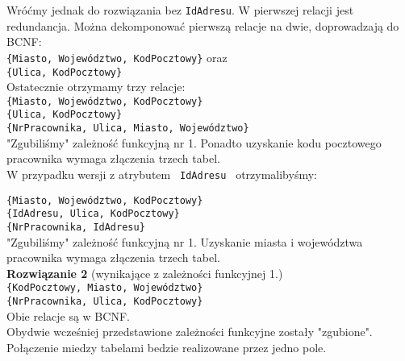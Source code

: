 \documentclass[a5paper,6pt]{article}
\begin{document}
    Wróćmy jednak do rozwiązania bez \texttt{IdAdresu}. W pierwszej relacji jest
    redundancja. Można dekomponować pierwszą relacje na dwie, doprowadzają do
    BCNF:\\
    \texttt{\{Miasto, Województwo, {\color{blue}\faKey}KodPocztowy\}} oraz\\
    \texttt{\{{\color{green}\faKey}Ulica, {\color{green}\faKey}KodPocztowy\}}\\

    Ostatecznie otrzymamy trzy relacje:\\
    \texttt{\{Miasto, Województwo, {\color{blue}\faKey}KodPocztowy\}}\\
    \texttt{\{{\color{green}\faKey}Ulica, {\color{green}\faKey}KodPocztowy\}}\\
    \texttt{\{{\color{green}\faKey}NrPracownika, Ulica, Miasto, Województwo\}}\\

    "Zgubiliśmy" zależność funkcyjną nr 1. Ponadto uzyskanie kodu pocztowego
    pracownika wymaga złączenia trzech tabel.\\

    W przypadku wersji z atrybutem \texttt{ IdAdresu } otrzymalibyśmy:

    \texttt{\{Miasto, Województwo, {\color{blue}\faKey}KodPocztowy\}}\\
    \texttt{\{{\color{red}\faKey}IdAdresu, {\color{blue}\faKey}Ulica,
    {\color{blue}\faKey}KodPocztowy\}}\\
    \texttt{\{{\color{green}\faKey}NrPracownika, IdAdresu\}}\\

    "Zgubiliśmy" zależność funkcyjną nr 1. Uzyskanie miasta i województwa
    pracownika wymaga złączenia trzech tabel.\\

    \textbf{Rozwiązanie 2} (wynikające z zależności funkcyjnej 1.)\\

    \texttt{\{{\color{green}\faKey}KodPocztowy, Miasto, Województwo\}}\\
    \texttt{\{{\color{green}\faKey}NrPracownika, Ulica, KodPocztowy\}}\\

    Obie relacje są w BCNF.\\
    Obydwie wcześniej przedstawione zależności funkcyjne zostały "zgubione".
    Połączenie miedzy tabelami bedzie realizowane przez jedno pole.\\\\
\end{document}
